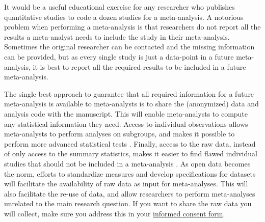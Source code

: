 \documentclass[
  oneside]{book}
\begin{document}
It would be a useful educational exercise for any researcher who publishes quantitative studies to code a dozen studies for a meta-analysis. A notorious problem when performing a meta-analysis is that researchers do not report all the results a meta-analyst needs to include the study in their meta-analysis. Sometimes the original researcher can be contacted and the missing information can be provided, but as every single study is just a data-point in a future meta-analysis, it is best to report all the required results to be included in a future meta-analysis.

The single best approach to guarantee that all required information for a future meta-analysis is available to meta-analysts is to share the (anonymized) data and analysis code with the manuscript. This will enable meta-analysts to compute any statistical information they need. Access to individual observations allows meta-analysts to perform analyses on subgroups, and makes it possible to perform more advanced statistical tests \citep{stewart_ipd_2002}. Finally, access to the raw data, instead of only access to the summary statistics, makes it easier to find flawed individual studies that should not be included in a meta-analysis \citep{lawrence_lesson_2021}. As open data becomes the norm, efforts to standardize measures and develop specifications for datasets will facilitate the availability of raw data as input for meta-analyses. This will also facilitate the re-use of data, and allow researchers to perform meta-analyses unrelated to the main research question. If you want to share the raw data you will collect, make sure you address this in your \href{https://www.uu.nl/en/research/research-data-management/guides/informed-consent-for-data-sharing}{informed consent form}.
\end{document}
